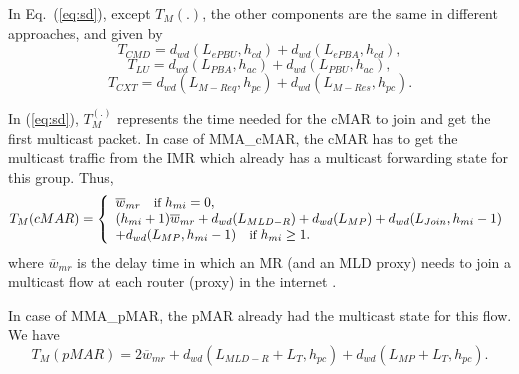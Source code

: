 In Eq.~(\ref{eq:sd}), except $T_{M}{(.)}$, the other components are the same in different approaches, and given by\\
\begin{equation}
T_{CMD} = d_{wd}(L_{ePBU},h_{cd}) + d_{wd}(L_{ePBA},h_{cd}),
\end{equation}
\begin{equation}
T_{LU} = d_{wd}(L_{PBA}, h_{ac}) + d_{wd}(L_{PBU}, h_{ac}),
\end{equation}
\begin{equation}
T_{CXT} = d_{wd}(L_{M-Req},h_{pc}) +d_{wd}(L_{M-Res},h_{pc}).
\end{equation}

In (\ref{eq:sd}), $T_{M}^{(.)}$ represents the time needed for the cMAR to join and get the first multicast packet. In case of MMA\_cMAR, the cMAR has to get the multicast traffic from the IMR which already has a multicast forwarding state for this group. Thus, \\
\small
\[ T_{M}(cMAR) = \left\{ 
 \begin{array}{l l}
   \overline{w}_{mr} \quad \small \text{if } h_{mi} =0,  \\
   (h_{mi} +1) \overline{w}_{mr}+d_{wd}(L_{MLD-R}) + d_{wd}(L_{MP}) +  d_{wd}(L_{Join},h_{mi}-1) \\+d_{wd}(L_{MP},h_{mi}-1)   \quad \small \text{if }h_{mi} \geq 1. 
 \end{array} \right.\] 
\normalsize 
where $\overline{w}_{mr}$ is the delay time in which an MR (and an MLD proxy) needs to join a multicast flow at each router (proxy) in the internet \cite{MPDSR}. 

In case of MMA\_pMAR, the pMAR already had the multicast state for this flow. We have \\
\begin{equation}
T_{M}(pMAR) = 2\overline{w}_{mr} +d_{wd}(L_{MLD-R}+L_{T},h_{pc})+d_{wd}(L_{MP} +L_{T},h_{pc}).
\end{equation}

